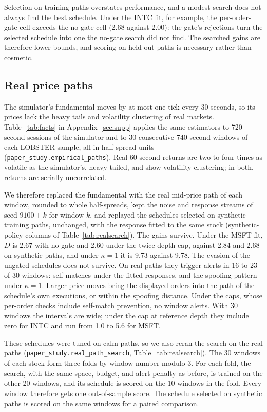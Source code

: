\documentclass{article}
\begin{document}
Selection on training paths overstates performance, and a modest search does not always find the best schedule. Under the INTC fit, for example, the per-order-gate cell exceeds the no-gate cell (2.68 against 2.00): the gate's rejections turn the selected schedule into one the no-gate search did not find. The searched gains are therefore lower bounds, and scoring on held-out paths is necessary rather than cosmetic.

\subsection{Real price paths}\label{sec:realpaths}

The simulator's fundamental moves by at most one tick every 30 seconds, so its prices lack the heavy tails and volatility clustering of real markets. Table~\ref{tab:facts} in Appendix~\ref{sec:supp} applies the same estimators to 720-second sessions of the simulator and to 30 consecutive 740-second windows of each LOBSTER sample, all in half-spread units (\texttt{paper\_study.empirical\_paths}). Real 60-second returns are two to four times as volatile as the simulator's, heavy-tailed, and show volatility clustering; in both, returns are serially uncorrelated.

We therefore replaced the fundamental with the real mid-price path of each window, rounded to whole half-spreads, kept the noise and response streams of seed $9100 + k$ for window $k$, and replayed the schedules selected on synthetic training paths, unchanged, with the response fitted to the same stock (synthetic-policy columns of Table~\ref{tab:realsearch}). The gains survive. Under the MSFT fit, $D$ is 2.67 with no gate and 2.60 under the twice-depth cap, against 2.84 and 2.68 on synthetic paths, and under $\kappa = 1$ it is 9.73 against 9.78. The evasion of the ungated schedules does not survive. On real paths they trigger alerts in 16 to 23 of 30 windows: self-matches under the fitted responses, and the spoofing pattern under $\kappa = 1$. Larger price moves bring the displayed orders into the path of the schedule's own executions, or within the spoofing distance. Under the caps, whose per-order checks include self-match prevention, no window alerts. With 30 windows the intervals are wide; under the cap at reference depth they include zero for INTC and run from 1.0 to 5.6 for MSFT.

These schedules were tuned on calm paths, so we also reran the search on the real paths (\texttt{paper\_study.real\_path\_search}, Table~\ref{tab:realsearch}). The 30 windows of each stock form three folds by window number modulo 3. For each fold, the search, with the same space, budget, and alert penalty as before, is trained on the other 20 windows, and its schedule is scored on the 10 windows in the fold. Every window therefore gets one out-of-sample score. The schedule selected on synthetic paths is scored on the same windows for a paired comparison.
\end{document}
